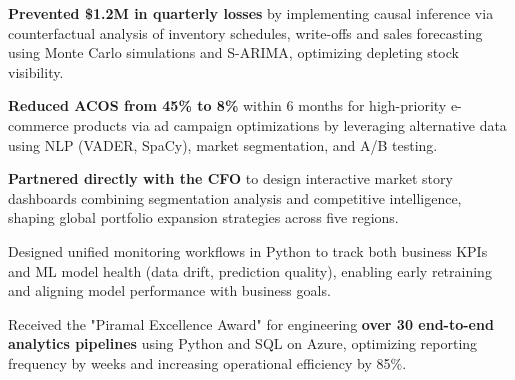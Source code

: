 \documentclass[letterpaper,11pt]{article}
\newcommand{\resumeItem}[1]{
  \item{\small{#1}}
  \vspace{-1.5px}
}
\begin{document}
\resumeItem{\textbf{Prevented \$1.2M in quarterly losses} by implementing causal inference via counterfactual analysis of inventory schedules, write-offs and sales forecasting using Monte Carlo simulations and S-ARIMA, optimizing depleting stock visibility.}

\resumeItem{\textbf{Reduced ACOS from 45\% to 8\%} within 6 months for high-priority e-commerce products via ad campaign optimizations by leveraging alternative data using NLP (VADER, SpaCy), market segmentation, and A/B testing.}

\resumeItem{\textbf{Partnered directly with the CFO} to design interactive market story dashboards combining segmentation analysis and competitive intelligence, shaping global portfolio expansion strategies across five regions.}

\resumeItem{Designed unified monitoring workflows in Python to track both business KPIs and ML model health (data drift, prediction quality), enabling early retraining and aligning model performance with business goals.}

\resumeItem{Received the "Piramal Excellence Award" for engineering \textbf{over 30 end-to-end analytics pipelines} using Python and SQL on Azure, optimizing reporting frequency by weeks and increasing operational efficiency by 85\%.}











\end{document}
